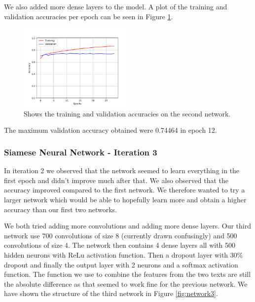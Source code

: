 We also added more dense layers to the model. A plot of the
training and validation accuracies per epoch can be seen in Figure
\ref{fig:network2_accuracies}.

\begin{figure}
    \centering
    \includegraphics[width=0.5\textwidth]{./pictures/experiments/network_2_accuracies.png}
    \caption{Shows the training and validation accuracies on the second
        network.}
    \label{fig:network2_accuracies}
\end{figure}

The maximum validation accuracy obtained were 0.74464 in epoch 12.


\subsubsection{Siamese Neural Network - Iteration 3}

In iteration 2 we observed that the network seemed to learn everything in the
first epoch and didn't improve much after that. We also observed that the
accuracy improved compared to the first network. We therefore wanted to try a
larger network which would be able to hopefully learn more and obtain a higher
accuracy than our first two networks.

We both tried adding more convolutions and adding more dense layers. Our third
network use 700 convolutions of size 8 (currently drawn confusingly) and 500
convolutions of size 4. The network then contains 4 dense layers all with 500
hidden neurons with \gls{ReLu} activation function. Then a dropout layer with
30\% dropout and finally the output layer with 2 neurons and a softmax
activation function. The function we use to combine the features from the two
texts are still the absolute difference as that seemed to work fine for the
previous network. We have shown the structure of the third network in Figure
\ref{fig:network3}.

